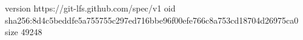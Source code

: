 version https://git-lfs.github.com/spec/v1
oid sha256:8d4c5beddfe5a755755c297ed716bbe96f00efe766c8a753cd18704d26975ca0
size 49248
